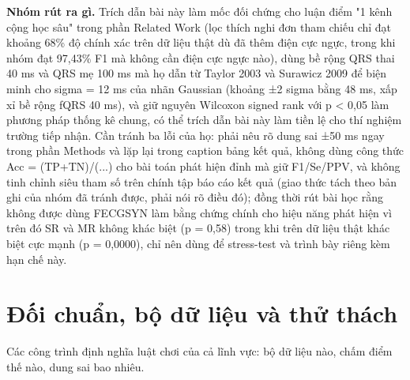 \documentclass[12pt,a4paper]{article}
\begin{document}
\noindent \textbf{\color{tdtblue}Nhóm rút ra gì.} Trích dẫn bài này làm mốc đối chứng cho luận điểm "1 kênh cộng học sâu" trong phần Related Work (lọc thích nghi đơn tham chiếu chỉ đạt khoảng 68\% độ chính xác trên dữ liệu thật dù đã thêm điện cực ngực, trong khi nhóm đạt 97,43\% F1 mà không cần điện cực ngực nào), dùng bề rộng QRS thai 40 ms và QRS mẹ 100 ms mà họ dẫn từ Taylor 2003 và Surawicz 2009 để biện minh cho sigma = 12 ms của nhãn Gaussian (khoảng ±2 sigma bằng 48 ms, xấp xỉ bề rộng fQRS 40 ms), và giữ nguyên Wilcoxon signed rank với p < 0,05 làm phương pháp thống kê chung, có thể trích dẫn bài này làm tiền lệ cho thí nghiệm trường tiếp nhận. Cần tránh ba lỗi của họ: phải nêu rõ dung sai ±50 ms ngay trong phần Methods và lặp lại trong caption bảng kết quả, không dùng công thức Acc = (TP+TN)/(...) cho bài toán phát hiện đỉnh mà giữ F1/Se/PPV, và không tinh chỉnh siêu tham số trên chính tập báo cáo kết quả (giao thức tách theo bản ghi của nhóm đã tránh được, phải nói rõ điều đó); đồng thời rút bài học rằng không được dùng FECGSYN làm bằng chứng chính cho hiệu năng phát hiện vì trên đó SR và MR không khác biệt (p = 0,58) trong khi trên dữ liệu thật khác biệt cực mạnh (p = 0,0000), chỉ nên dùng để stress-test và trình bày riêng kèm hạn chế này.\par\vspace{3pt}
\vspace{6pt}
\clearpage
\section{Đối chuẩn, bộ dữ liệu và thử thách}
Các công trình định nghĩa luật chơi của cả lĩnh vực: bộ dữ liệu nào, chấm điểm thế nào, dung sai bao nhiêu.
\end{document}

